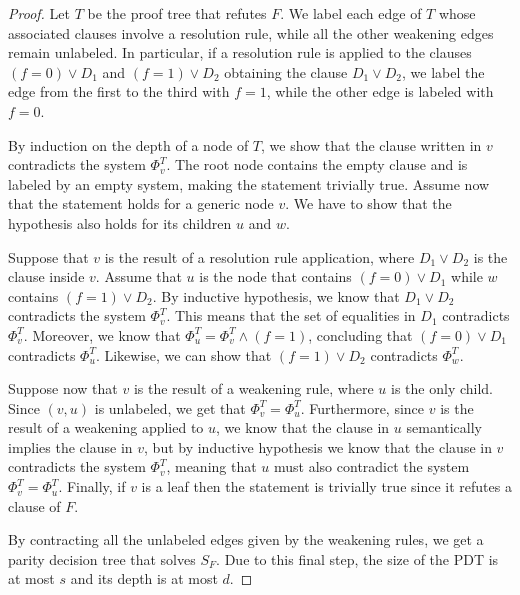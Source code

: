 \begin{proof}
 Let $T$ be the proof tree that refutes $F$. We label each edge of $T$ whose associated clauses involve a resolution rule, while all the other weakening edges remain unlabeled. In particular, if a resolution rule is applied to the clauses $(f = 0) \lor D_1$ and $(f = 1) \lor D_2$ obtaining the clause $D_1 \lor D_2$, we label the edge from the first to the third with $f = 1$, while the other edge is labeled with $f = 0$.

 By induction on the depth of a node of $T$, we show that the clause written in $v$ contradicts the system $\Phi_v^T$. The root node contains the empty clause and is labeled by an empty system, making the statement trivially true. Assume now that the statement holds for a generic node $v$. We have to show that the hypothesis also holds for its children $u$ and $w$.

 Suppose that $v$ is the result of a resolution rule application, where $D_1 \lor D_2$ is the clause inside $v$. Assume that $u$ is the node that contains $(f = 0) \lor D_1$ while $w$ contains $(f = 1) \lor D_2$. By inductive hypothesis, we know that $D_1 \lor D_2$ contradicts the system $\Phi_v^T$. This means that the set of equalities in $D_1$ contradicts $\Phi_v^T$. Moreover, we know that $\Phi_u^T = \Phi_v^T \land (f = 1)$, concluding that $(f = 0) \lor D_1$ contradicts $\Phi_u^T$. Likewise, we can show that $(f = 1) \lor D_2$ contradicts $\Phi_w^T$.
    
 Suppose now that $v$ is the result of a weakening rule, where $u$ is the only child. Since $(v,u)$ is unlabeled, we get that $\Phi_v^T = \Phi_u^T$. Furthermore, since $v$ is the result of a weakening applied to $u$, we know that the clause in $u$ semantically implies the clause in $v$, but by inductive hypothesis we know that the clause in $v$ contradicts the system $\Phi_v^T$, meaning that $u$ must also contradict the system $\Phi_v^T = \Phi_u^T$. Finally, if $v$ is a leaf then the statement is trivially true since it refutes a clause of $F$.

 By contracting all the unlabeled edges given by the weakening rules, we get a parity decision tree that solves $S_F$. Due to this final step, the size of the PDT is at most $s$ and its depth is at most $d$. 
\end{proof}

